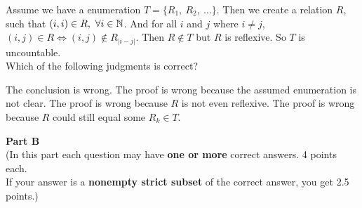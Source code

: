 \begin{questions}
Assume we have a enumeration $T = \{R_1,\ R_2,\ \dots\}$. Then we create a relation $R$, such that $(i,i)\in R,\ \forall i\in {\mathbb N}{}$. And for all $i$ and $j$ where $i\neq j$, $(i,j)\in R \iff (i,j)\not\in R_{\lvert i-j \rvert}$. Then $R\not\in T$ but $R$ is reflexive. So $T$ is uncountable.\\

Which of the following judgments is correct?
\begin{choices}
\choice The conclusion is wrong.
\choice The proof is wrong because the assumed enumeration is not clear.
\choice The proof is wrong because $R$ is not even reflexive.
\choice The proof is wrong because $R$ could still equal some $R_k\in T$.
\choice {}
\end{choices}

\end{questions}

\newpage

\begin{center}
{\bf Part B}\\
\medskip
(In this part each question may have {\bf one or more} correct answers. 4 points each.\\ If your answer is a {\bf nonempty strict subset} of the correct answer, you get 2.5 points.)
\end{center}
\bigskip

